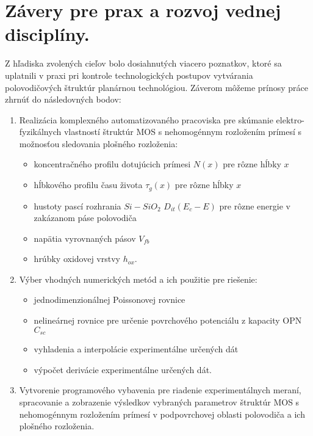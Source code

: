 \chapter{Závery pre prax a rozvoj vednej disciplíny.}
\label{Chapter9}

Z hľadiska zvolených cieľov bolo dosiahnutých viacero poznatkov, ktoré
sa uplatnili v praxi pri kontrole technologických postupov vytvárania
polovodičových štruktúr planárnou technológiou. Záverom môžeme prínosy
práce zhrnúť do následovných bodov:

\begin{enumerate}

\item Realizácia komplexného automatizovaného pracoviska pre skúmanie
  elektro-fyzikálnych vlastností štruktúr MOS s nehomogénnym
  rozložením prímesí s možnosťou sledovania plošného rozloženia:
\begin{itemize}
\item koncentračného profilu dotujúcich prímesi $N(x)$ pre rôzne hĺbky
  $x$
\item hĺbkového profilu času života $\tau_{g}(x)$ pre rôzne hĺbky $x$
\item hustoty pascí rozhrania $Si-SiO_{2}$ $D_{it}(E_{c}-E)$ pre rôzne
  energie v zakázanom páse polovodiča
\item napätia vyrovnaných pásov $V_{fb}$
\item hrúbky oxidovej vrstvy $h_{ox}$.
\end{itemize}

\item Výber vhodných numerických metód a ich použitie pre riešenie:
\begin{itemize}

\item jednodimenzionálnej Poissonovej rovnice

\item nelineárnej rovnice pre určenie povrchového potenciálu z
  kapacity OPN $C_{sc}$
  
\item vyhladenia a interpolácie experimentálne určených dát

\item výpočet derivácie experimentálne určených dát.

\end{itemize}

\item Vytvorenie programového vybavenia pre riadenie experimentálnych
  meraní, spracovanie a zobrazenie výsledkov vybraných parametrov
  štruktúr MOS s nehomogénnym rozložením prímesí v podpovrchovej
  oblasti polovodiča a ich plošného rozloženia.


\end{enumerate}
